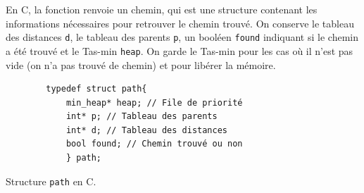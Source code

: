 En C, la fonction renvoie un chemin, qui est une structure contenant les informations nécessaires pour retrouver le chemin trouvé.
\newline\newline
On conserve le tableau des distances \texttt{d}, le tableau des parents \texttt{p}, un booléen \texttt{found} indiquant si le chemin a été trouvé et le Tas-min \texttt{heap}.
On garde le Tas-min pour les cas où il n'est pas vide (on n'a pas trouvé de chemin) et pour libérer la mémoire.

\begin{listing}[!htpb]
    \begin{verbatim}
        typedef struct path{
            min_heap* heap; // File de priorité
            int* p; // Tableau des parents
            int* d; // Tableau des distances
            bool found; // Chemin trouvé ou non
            } path;
    \end{verbatim}
    \caption{Structure \texttt{path} en C.}
    \label{listing:c-path}
\end{listing}